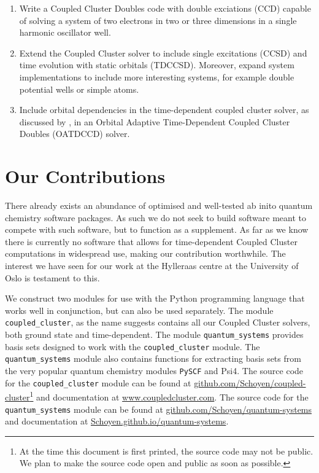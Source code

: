     \begin{enumerate}
        \item Write a Coupled Cluster Doubles code with double exciations (CCD)
            capable of solving a system of two electrons in two or three dimensions 
            in a single harmonic oscillator well.
        \item Extend the Coupled Cluster solver to include single excitations (CCSD)
            and time evolution with static orbitals (TDCCSD). Moreover, expand system
            implementations to include more interesting systems, for example double
            potential wells or simple atoms.
        \item Include orbital dependencies in the time-dependent coupled cluster solver, as 
            discussed by \citeauthor{kvaal2012ab}\cite{kvaal2012ab}, in an Orbital Adaptive 
            Time-Dependent Coupled Cluster Doubles (OATDCCD) solver.
    \end{enumerate}

\section{Our Contributions}

    There already exists an abundance of optimised and well-tested ab inito quantum chemistry 
    software packages. As such we do not seek to build software meant to compete 
    with such software, but to function as a supplement. As far as we know 
    there is currently no software that allows for time-dependent Coupled Cluster 
    computations in widespread use, making our contribution worthwhile. The interest 
    we have seen for our work at the Hylleraas centre at the University of Oslo 
    is testament to this\cite{islandwind2019numerically}.

    We construct two modules for use with the Python programming language that works
    well in conjunction, but 
    can also be used separately. The module \lstinline{coupled_cluster}, as the  
    name suggests contains all our Coupled Cluster solvers, both ground state and 
    time-dependent. The module \lstinline{quantum_systems} provides basis sets
    designed to work with the \lstinline{coupled_cluster} module. The 
    \lstinline{quantum_systems} module also contains functions for extracting basis sets 
    from the very popular quantum chemistry modules \lstinline{PySCF}\cite{PYSCF}
    and Psi4\cite{parrish2017psi4}. The source code for the \lstinline{coupled_cluster} module 
    can be found at
    \url{github.com/Schoyen/coupled-cluster}\footnote{At the time this document is 
    first printed, the source code may not be public. We plan to make the source code 
    open and public as soon as possible.} and documentation at 
    \url{www.coupledcluster.com}.
    The source code for the \lstinline{quantum_systems} module 
    can be found at
    \url{github.com/Schoyen/quantum-systems} and documentation at 
    \url{Schoyen.github.io/quantum-systems}.

